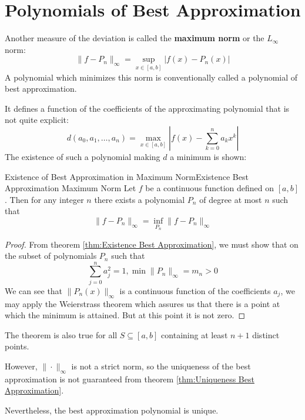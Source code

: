\documentclass[../main.tex]{subfiles}
\begin{document}
\section{Polynomials of Best Approximation}
Another measure of the deviation is called the \textbf{maximum norm} or the $L_\infty$ norm:
\begin{equation}
	\| f - P_n \|_\infty = \sup_{x \in [a,b]} |f(x) - P_n(x)|
\end{equation}
A polynomial which minimizes this norm is conventionally called a polynomial of best approximation.

It defines a function of the coefficients of the approximating polynomial that is not quite explicit:
\begin{equation*}
	d(a_0, a_1, \dots, a_n) = \max_{x \in [a,b]} |f(x) - \sum_{k=0}^n a_k x^k|
\end{equation*}
The existence of such a polynomial making $d$ a minimum is shown:
\begin{theorem}{Existence of Best Approximation in Maximum Norm}{Existence Best Approximation Maximum Norm}
	Let $f$ be a continuous function defined on $[a,b]$. Then for any integer $n$ there exists a polynomial $P_n$ of degree at most $n$ such that
	\begin{equation}
		\| f - P_n \|_\infty = \inf_{P_n} \| f - P_n \|_\infty
	\end{equation}
\end{theorem}
\begin{proof}
	From theorem \ref{thm:Existence Best Approximation}, we must show that on the subset of polynomials $P_n$ such that
	\begin{equation*}
		\sum_{j=0}^{n} a_j^2 = 1, \min \|P_n\|_\infty = m_n > 0
	\end{equation*}
	We can see that $\|P_n(x)\|_\infty $ is a continuous function of the coefficients $a_j$, we may apply the Weierstrass theorem which assures us that there is a point at which the minimum is attained. But at this point it is not zero.
\end{proof}
\begin{remark}
	The theorem is also true for all $S \subseteq [a,b]$ containing at least $n+1$ distinct points.
\end{remark}

However, $\| \cdot \|_\infty$ is not a strict norm, so the uniqueness of the best approximation is not guaranteed from theorem \ref{thm:Uniqueness Best Approximation}.

Nevertheless, the best approximation polynomial is unique.
\end{document}
